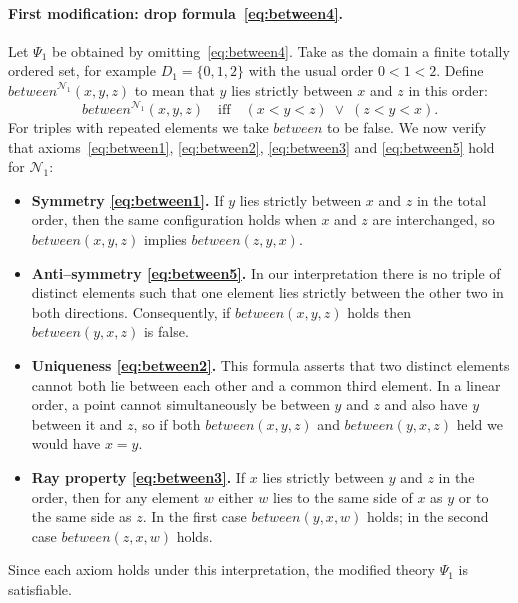 \documentclass[12pt]{article}
\begin{document}
\paragraph{First modification: drop formula~\eqref{eq:between4}.}
Let $\Psi_1$ be obtained by omitting~\eqref{eq:between4}.  Take as the domain a finite totally ordered set, for example $D_1=\{0,1,2\}$ with the usual order $0<1<2$.  Define $\mathit{between}^{\mathcal{N}_1}(x,y,z)$ to mean that $y$ lies strictly between $x$ and $z$ in this order:
\[
\mathit{between}^{\mathcal{N}_1}(x,y,z)\quad\text{iff}\quad (x<y<z)\;\lor\;(z<y<x).
\]
For triples with repeated elements we take $\mathit{between}$ to be false.  We now verify that axioms~\eqref{eq:between1}, \eqref{eq:between2}, \eqref{eq:between3} and \eqref{eq:between5} hold for $\mathcal{N}_1$:
\begin{itemize}
  \item \textbf{Symmetry \eqref{eq:between1}.}  If $y$ lies strictly between $x$ and $z$ in the total order, then the same configuration holds when $x$ and $z$ are interchanged, so $\mathit{between}(x,y,z)$ implies $\mathit{between}(z,y,x)$.
  \item \textbf{Anti--symmetry \eqref{eq:between5}.}  In our interpretation there is no triple of distinct elements such that one element lies strictly between the other two in both directions.  Consequently, if $\mathit{between}(x,y,z)$ holds then $\mathit{between}(y,x,z)$ is false.
  \item \textbf{Uniqueness \eqref{eq:between2}.}  This formula asserts that two distinct elements cannot both lie between each other and a common third element.  In a linear order, a point cannot simultaneously be between $y$ and $z$ and also have $y$ between it and $z$, so if both $\mathit{between}(x,y,z)$ and $\mathit{between}(y,x,z)$ held we would have $x=y$.
  \item \textbf{Ray property \eqref{eq:between3}.}  If $x$ lies strictly between $y$ and $z$ in the order, then for any element $w$ either $w$ lies to the same side of $x$ as $y$ or to the same side as $z$.  In the first case $\mathit{between}(y,x,w)$ holds; in the second case $\mathit{between}(z,x,w)$ holds.
\end{itemize}
Since each axiom holds under this interpretation, the modified theory $\Psi_1$ is satisfiable.
\end{document}
